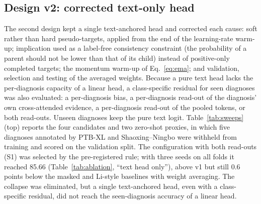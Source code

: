\subsection{Design v2: corrected text-only head}\label{secA2:v2}
The second design kept a single text-anchored head and corrected each cause: soft rather than hard pseudo-targets, applied from the end of the learning-rate warm-up; implication used as a label-free consistency constraint (the probability of a parent should not be lower than that of its child) instead of positive-only completed targets; the momentum warm-up of Eq.~\eqref{eq:ema}; and validation, selection and testing of the averaged weights. Because a pure text head lacks the per-diagnosis capacity of a linear head, a class-specific residual for seen diagnoses was also evaluated: a per-diagnosis bias, a per-diagnosis read-out of the diagnosis' own cross-attended evidence, a per-diagnosis read-out of the pooled tokens, or both read-outs. Unseen diagnoses keep the pure text logit. Table~\ref{tab:sweeps} (top) reports the four candidates and two zero-shot proxies, in which five diagnoses annotated by PTB-XL and Shaoxing--Ningbo were withheld from training and scored on the validation split. The configuration with both read-outs (S1) was selected by the pre-registered rule; with three seeds on all folds it reached 85.66 (Table~\ref{tab:ablation}, ``text head only''), above v1 but still 0.6 points below the masked and Li-style baselines with weight averaging. The collapse was eliminated, but a single text-anchored head, even with a class-specific residual, did not reach the seen-diagnosis accuracy of a linear head.

